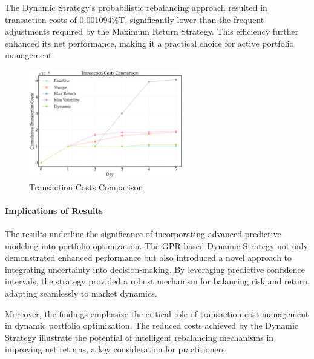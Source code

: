 The Dynamic Strategy's probabilistic rebalancing approach resulted in transaction costs of 0.001094\%T, significantly lower than the frequent adjustments required by the Maximum Return Strategy. 
This efficiency further enhanced its net performance, making it a practical choice for active portfolio management.
\begin{figure}[htbp]
    \centering
    \includegraphics[width=0.6\textwidth]{figures/trx_costs_comparison_final_non.png}
    \caption{Transaction Costs Comparison}
    \label{fig:trx_costs_comparison_non_iterative}
\end{figure}

\paragraph{Implications of Results}

The results underline the significance of incorporating advanced predictive modeling into portfolio optimization. The GPR-based Dynamic Strategy not only demonstrated enhanced performance but also introduced a novel approach to integrating uncertainty into decision-making. By leveraging predictive confidence intervals, the strategy provided a robust mechanism for balancing risk and return, adapting seamlessly to market dynamics.

Moreover, the findings emphasize the critical role of transaction cost management in dynamic portfolio optimization. The reduced costs achieved by the Dynamic Strategy illustrate the potential of intelligent rebalancing mechanisms in improving net returns, a key consideration for practitioners.

